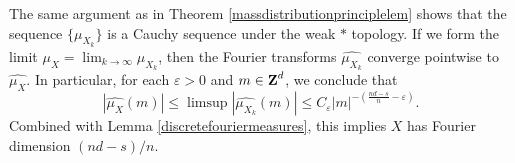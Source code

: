 The same argument as in Theorem \ref{massdistributionprinciplelem} shows that the sequence $\{ \mu_{X_k} \}$ is a Cauchy sequence under the weak $*$ topology. If we form the limit $\mu_X = \lim_{k \to \infty} \mu_{X_k}$, then the Fourier transforms $\widehat{\mu_{X_k}}$ converge pointwise to $\widehat{\mu_X}$. In particular, for each $\varepsilon > 0$ and $m \in \operatorname{\mathbf{Z}}^d$, we conclude that
%
\[ |\widehat{\mu_X}(m)| \leq \limsup |\widehat{\mu_{X_k}}(m)| \leq C_\varepsilon |m|^{- \left( \frac{nd - s}{n} - \varepsilon \right)}. \]
%
Combined with Lemma \ref{discretefouriermeasures}, this implies $X$ has Fourier dimension $(nd - s)/n$.

\endinput